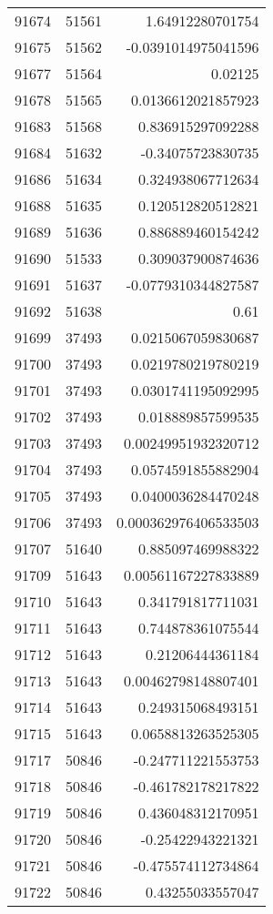 \begin{tabular}{r | r | r}
91674 & 51561 & 1.64912280701754 \\
91675 & 51562 & -0.0391014975041596 \\
91677 & 51564 & 0.02125 \\
91678 & 51565 & 0.0136612021857923 \\
91683 & 51568 & 0.836915297092288 \\
91684 & 51632 & -0.34075723830735 \\
91686 & 51634 & 0.324938067712634 \\
91688 & 51635 & 0.120512820512821 \\
91689 & 51636 & 0.886889460154242 \\
91690 & 51533 & 0.309037900874636 \\
91691 & 51637 & -0.0779310344827587 \\
91692 & 51638 & 0.61 \\
91699 & 37493 & 0.0215067059830687 \\
91700 & 37493 & 0.0219780219780219 \\
91701 & 37493 & 0.0301741195092995 \\
91702 & 37493 & 0.018889857599535 \\
91703 & 37493 & 0.00249951932320712 \\
91704 & 37493 & 0.0574591855882904 \\
91705 & 37493 & 0.0400036284470248 \\
91706 & 37493 & 0.000362976406533503 \\
91707 & 51640 & 0.885097469988322 \\
91709 & 51643 & 0.00561167227833889 \\
91710 & 51643 & 0.341791817711031 \\
91711 & 51643 & 0.744878361075544 \\
91712 & 51643 & 0.21206444361184 \\
91713 & 51643 & 0.00462798148807401 \\
91714 & 51643 & 0.249315068493151 \\
91715 & 51643 & 0.0658813263525305 \\
91717 & 50846 & -0.247711221553753 \\
91718 & 50846 & -0.461782178217822 \\
91719 & 50846 & 0.436048312170951 \\
91720 & 50846 & -0.25422943221321 \\
91721 & 50846 & -0.475574112734864 \\
91722 & 50846 & 0.43255033557047 \\

\end{tabular}
